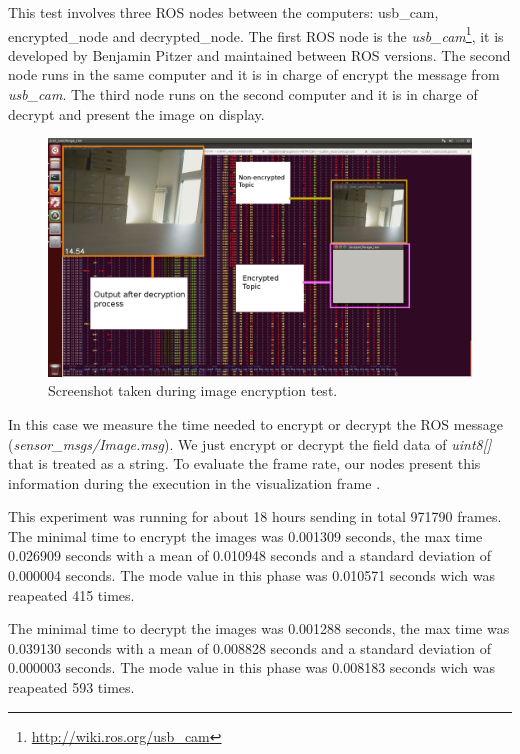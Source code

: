 \documentclass[journal,twoside]{JoPhA}
\begin{document}
This test involves three ROS nodes between the computers: usb\_cam, encrypted\_node and decrypted\_node. The first ROS node is the {\em usb\_cam}\footnote{\url{http://wiki.ros.org/usb_cam}}, it is developed by Benjamin Pitzer and maintained between ROS versions.
The second node runs in the same computer and it is in charge of encrypt the message from {\em usb\_cam}. The third node runs on the second computer and it is in charge of decrypt and present the image on display.




\begin{figure}[ht]
    \centering
    \includegraphics[width=.99\textwidth]{Screenshot.png}
    \caption{Screenshot taken during image encryption test.}
  \label{fig:screenshot}
\end{figure}

In this case we measure the time needed to encrypt or decrypt the ROS message ({\em sensor\_msgs/Image.msg}). We just encrypt or decrypt the field data of {\em uint8[]} that is treated as a string.
To evaluate  the frame rate, our nodes present this information during the execution in the visualization frame . 

This experiment was running for about 18 hours sending in total 971790 frames. The minimal time to encrypt the images was 0.001309 seconds, the max time  0.026909 seconds with a 
mean of  0.010948 seconds and a standard deviation of 0.000004 seconds. The mode value in this phase was 0.010571 seconds wich was reapeated 415 times. 

The minimal time to decrypt the images was 0.001288 seconds, the max time was 0.039130 seconds with a 
mean of  0.008828 seconds and a standard deviation of 0.000003 seconds. The mode value in this phase was 0.008183 seconds wich was reapeated 593 times. 
\end{document}
